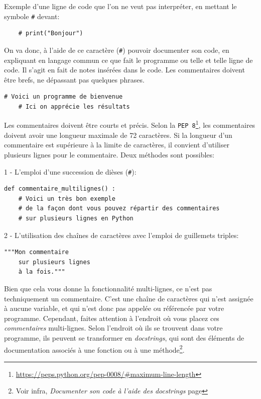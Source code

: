 \documentclass[a4paper,12pt]{book}
\begin{document}
Exemple d'une ligne de code que l'on ne veut pas interpréter, en mettant le symbole \texttt{\#} devant:
\begin{verbatim}
    # print("Bonjour")
\end{verbatim}
\medskip

On va donc, à l'aide de ce caractère (\texttt{\#}) pouvoir documenter son code, en expliquant en langage commun ce que fait le programme ou telle et telle ligne de code. Il s'agit en fait de notes insérées dans le code. Les commentaires doivent être brefs, ne dépassant pas quelques phrases.
\begin{lstlisting}[caption=Exemple de commentaire]
    # Voici un programme de bienvenue
    # Ici on apprécie les résultats
\end{lstlisting}
\medskip

Les commentaires doivent être courts et précis. Selon la \texttt{PEP 8}\footnote{\url{https://peps.python.org/pep-0008/\#maximum-line-length}}, les commentaires doivent avoir une longueur maximale de 72 caractères. Si la longueur d'un commentaire est supérieure à la limite de caractères, il convient d'utiliser plusieurs lignes pour le commentaire. Deux méthodes sont possibles:
\medskip

1 - L'emploi d'une succession de dièses (\texttt{\#}):
\begin{lstlisting}
def commentaire_multilignes() :
    # Voici un très bon exemple
    # de la façon dont vous pouvez répartir des commentaires
    # sur plusieurs lignes en Python
\end{lstlisting} 
\medskip

2 - L'utilisation des chaînes de caractères avec l'emploi de guillemets triples:
\begin{lstlisting}[caption=Commentaire sur plusieurs lignes]
    """Mon commentaire
    sur plusieurs lignes
    à la fois."""
\end{lstlisting}
\medskip

Bien que cela vous donne la fonctionnalité multi-lignes, ce n'est pas techniquement un commentaire. C'est une chaîne de caractères qui n'est assignée à aucune variable, et qui n'est donc pas appelée ou référencée par votre programme. Cependant, faites attention à l'endroit où vous placez ces \og{} \textit{commentaires}\fg{} multi-lignes. Selon l'endroit où ils se trouvent dans votre programme, ils peuvent se transformer en \textit{docstrings}, qui sont des éléments de documentation associés à une fonction ou à une méthode\footnote{Voir infra, \og \textit{Documenter son code à l'aide des docstrings}\fg{} page \pageref{documenteravecdocstring}}. 
\medskip
\end{document}
